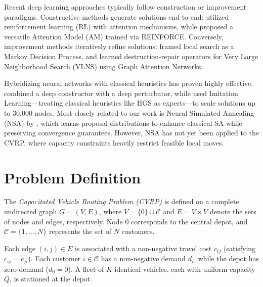 \documentclass[letterpaper]{article} %
\begin{document}
Recent deep learning approaches typically follow construction or improvement paradigms. Constructive methods generate solutions end-to-end: \citet{nazari_reinforcement_2018} utilized reinforcement learning (RL) with attention mechanisms, while \citet{kool_attention_2019} proposed a versatile Attention Model (AM) trained via REINFORCE. Conversely, improvement methods iteratively refine solutions: \citet{wu_learning_2022} framed local search as a Markov Decision Process, and \citet{gao_learn_2020} learned destruction-repair operators for Very Large Neighborhood Search (VLNS) using Graph Attention Networks.

Hybridizing neural networks with classical heuristics has proven highly effective. \citet{garcia-torres_combining_2022} combined a deep constructor with a deep perturbator, while \citet{bui_imitation_2023} used Imitation Learning—treating classical heuristics like HGS as experts—to scale solutions up to 30{,}000 nodes. Most closely related to our work is Neural Simulated Annealing (NSA) by \citet{correia_neural_2023}, which learns proposal distributions to enhance classical SA while preserving convergence guarantees. However, NSA has not yet been applied to the CVRP, where capacity constraints heavily restrict feasible local moves.



\section{Problem Definition}
\label{Problem Definition}

The {\it Capacitated Vehicle Routing Problem (CVRP)} is defined on a complete undirected graph $G = (V, E)$, where $V = \{0\} \cup \mathcal{C}$ and $E = V \times V$ denote the sets of nodes and edges, respectively. Node $0$ corresponds to the central depot, and $\mathcal{C} = \{1, \dots, N\}$ represents the set of $N$ customers. 

Each edge $(i, j) \in E$ is associated with a non-negative travel cost $c_{ij}$ (satisfying $c_{ij} = c_{ji}$). Each customer $i \in \mathcal{C}$ has a non-negative demand $d_i$, while the depot has zero demand ($d_0 = 0$). A fleet of $K$ identical vehicles, each with uniform capacity $Q$, is stationed at the depot.
\end{document}
